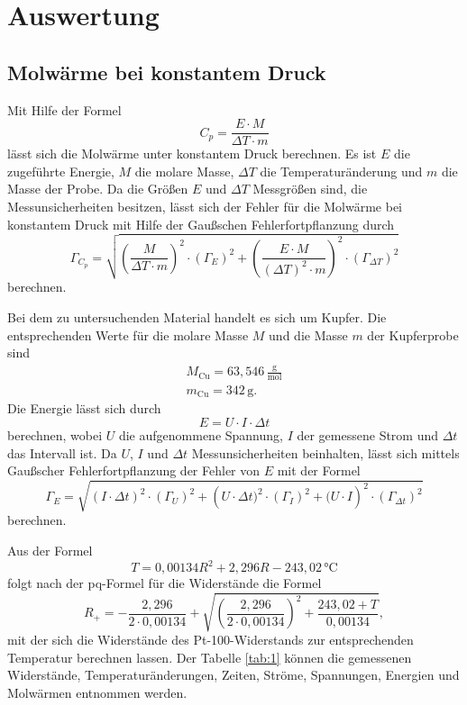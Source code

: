 \section{Auswertung}
\subsection{Molwärme bei konstantem Druck}
Mit Hilfe der Formel
\begin{equation}
  C_p = \frac{E \cdot M}{\Delta T \cdot m}
\end{equation}
lässt sich die Molwärme unter konstantem Druck berechnen.
Es ist $E$ die zugeführte Energie, $M$ die molare Masse, $\Delta T$ die Temperaturänderung und $m$ die Masse der Probe.
Da die Größen $E$ und $\Delta{T}$ Messgrößen sind, die Messunsicherheiten besitzen,
lässt sich der Fehler für die Molwärme bei konstantem Druck mit Hilfe der Gaußschen Fehlerfortpflanzung durch
\begin{equation}
  \Gamma_{C_p} = \sqrt{ \left(\frac{M}{\Delta{T}\cdot m }\right)^2 \cdot (\Gamma_E)^2 + \left(\frac{E\cdot{M}}{(\Delta{T})^2\cdot{m}}\right)^2\cdot(\Gamma_{\Delta{T}})^2 }
\end{equation}
berechnen.

Bei dem zu untersuchenden Material handelt es sich um Kupfer.
Die entsprechenden Werte für die molare Masse $M$ \cite{cu} und die Masse $m$ der Kupferprobe \cite{skript} sind
\begin{gather*}
  M_{\text{Cu}} = 63,546\,\frac{\text{g}}{\text{mol}} \\
  m_{\text{Cu}} = 342\,\si{\gram}.
\end{gather*}
Die Energie lässt sich durch
\begin{equation}
  E = U\cdot I\cdot \Delta t
\end{equation}
berechnen, wobei $U$ die aufgenommene Spannung, $I$ der gemessene Strom und $\Delta t$ das Intervall ist.
Da $U$, $I$ und $\Delta{t}$ Messunsicherheiten beinhalten,
lässt sich mittels Gaußscher Fehlerfortpflanzung der Fehler von $E$ mit der Formel
\begin{equation}
  \Gamma_E = \sqrt{ \left(I\cdot\Delta{t}\right)^2\cdot(\Gamma_U)^2 + \left(U\cdot\Delta{t})^2\cdot(\Gamma_I)^2 + (U\cdot{I}\right)^2\cdot(\Gamma_{\Delta{t}})^2 }
\end{equation}
berechnen.

Aus der Formel
\begin{equation}
  T = 0,00134R^2 + 2,296R - 243,02\,\text{°C}
\end{equation}
folgt nach der pq-Formel für die Widerstände die Formel
\begin{equation}
  R_+ = -\frac{2,296}{2\cdot0,00134} + \sqrt{ \left(\frac{2,296}{2\cdot0,00134}\right)^2 + \frac{243,02 + T}{0,00134} },
  \end{equation}
mit der sich die Widerstände des Pt-100-Widerstands zur entsprechenden Temperatur berechnen lassen.
Der Tabelle \ref{tab:1} können die gemessenen Widerstände, Temperaturänderungen, Zeiten, Ströme, Spannungen, Energien und Molwärmen entnommen werden.

